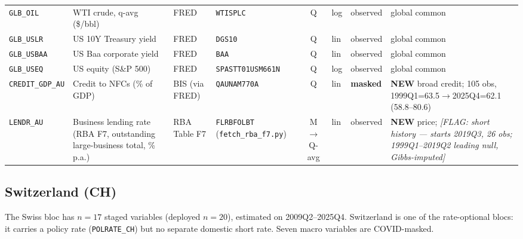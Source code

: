 {\begin{longtable}{@{}lp{2.9cm}p{1.9cm}p{2.0cm}cp{1.4cm}p{1.7cm}p{2.6cm}@{}}
\texttt{GLB\_OIL} & WTI crude, q-avg (\$/bbl) & FRED & \texttt{WTISPLC} & Q & log & observed & global common\\
\texttt{GLB\_USLR} & US 10Y Treasury yield & FRED & \texttt{DGS10} & Q & lin & observed & global common\\
\texttt{GLB\_USBAA} & US Baa corporate yield & FRED & \texttt{BAA} & Q & lin & observed & global common\\
\texttt{GLB\_USEQ} & US equity (S\&P 500) & FRED & \texttt{SPASTT01USM661N} & Q & log & observed & global common\\
\texttt{CREDIT\_GDP\_AU} & Credit to NFCs (\% of GDP) & BIS (via FRED) & \texttt{QAUNAM770A} & Q & lin & \textbf{masked} & \textbf{NEW} broad credit; 105 obs, 1999Q1=63.5$\to$2025Q4=62.1 (58.8--80.6)\\
\texttt{LENDR\_AU} & Business lending rate (RBA F7, outstanding large-business total, \% p.a.) & RBA Table F7 & \texttt{FLRBFOLBT} (\texttt{fetch\_rba\_f7.py}) & M$\to$Q-avg & lin & observed & \textbf{NEW} price; \textit{[FLAG: short history --- starts 2019Q3, 26 obs; 1999Q1--2019Q2 leading null, Gibbs-imputed]}\\
\end{longtable}}

\subsection{Switzerland (CH)}\label{sec:data:CH}

The Swiss bloc has $n=17$ staged variables (deployed $n=20$), estimated on
2009Q2--2025Q4. Switzerland is one of the rate-optional blocs: it carries a
policy rate (\texttt{POLRATE\_CH}) but no separate domestic short rate. Seven
macro variables are COVID-masked.

